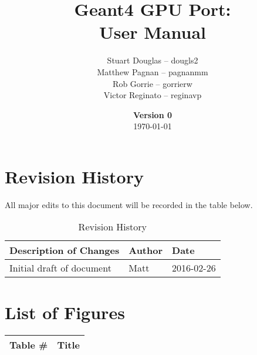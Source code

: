 \documentclass[12pt]{article}
\title{
\LARGE Geant4 GPU Port:
\\\vspace{10mm}
\large \textbf{User Manual}
\vspace{40mm}
}
\author{
Stuart Douglas -- dougls2
\\Matthew Pagnan -- pagnanmm
\\Rob Gorrie -- gorrierw
\\Victor Reginato -- reginavp
\vspace{10mm}
}
\date{\vfill \textbf{Version 0}\\ \today}
\begin{document}

\maketitle
\newpage

\tableofcontents
\newpage
{}
\restoregeometry

\section{Revision History}
All major edits to this document will be recorded in the table below.

\begin{table}[h]
\centering
\caption{Revision History}\label{Table_Revision}
\begin{tabular}{lll}
\toprule
\bf Description of Changes & \bf Author & \bf Date\\\midrule
Initial draft of document & Matt & 2016-02-26\\
\bottomrule
\end{tabular}
\end{table}

\section{List of Figures}
\begin{center}
\begin{tabular}{cl}
\toprule
\bf Table \# & \bf Title\\\midrule
\bottomrule
\end{tabular}
\end{center}
\end{document}
